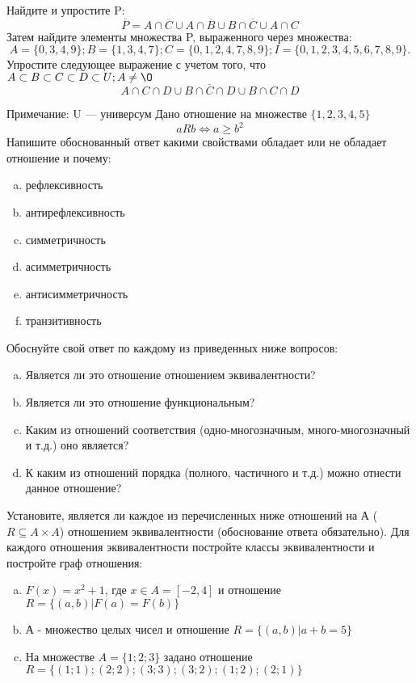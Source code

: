 \documentclass[10pt]{exam}
\begin{document}
\begin{questions}
\question
Найдите и упростите P:
\begin{equation*}
\overline{P} = A \cap \overline{C} \cup A \cap \overline{B} \cup B \cap \overline{C} \cup A \cap C
\end{equation*}
Затем найдите элементы множества P, выраженного через множества:
\begin{equation*}
A = \{0, 3, 4, 9\}; 
B = \{1, 3, 4, 7\};
C = \{0, 1, 2, 4, 7, 8, 9\};
I = \{0, 1, 2, 3, 4, 5, 6, 7, 8, 9\}.
\end{equation*}\question
Упростите следующее выражение с учетом того, что $A\subset B \subset C \subset D \subset U; A \neq \O$
\begin{equation*}
A \cap C  \cap D \cup B \cap \overline{C} \cap D \cup B \cap C \cap D
\end{equation*}

Примечание: U — универсум\question
Дано отношение на множестве $\{1, 2, 3, 4, 5\}$ 
\begin{equation*}
aRb \iff a \geq b^2
\end{equation*}
Напишите обоснованный ответ какими свойствами обладает или не обладает отношение и почему:   
\begin{enumerate} [a)]\setcounter{enumi}{0}
\item рефлексивность
\item антирефлексивность
\item симметричность
\item асимметричность
\item антисимметричность
\item транзитивность
\end{enumerate}

Обоснуйте свой ответ по каждому из приведенных ниже вопросов:
\begin{enumerate} [a)]\setcounter{enumi}{0}
    \item Является ли это отношение отношением эквивалентности?
    \item Является ли это отношение функциональным?
    \item Каким из отношений соответствия (одно-многозначным, много-многозначный и т.д.) оно является?
    \item К каким из отношений порядка (полного, частичного и т.д.) можно отнести данное отношение?
\end{enumerate}


\question
Установите, является ли каждое из перечисленных ниже отношений на А ($R \subseteq A \times A$) отношением эквивалентности (обоснование ответа обязательно). Для каждого отношения эквивалентности постройте классы эквивалентности и постройте граф отношения:
\begin{enumerate} [a)]\setcounter{enumi}{0}
\item $F(x)=x^{2}+1$, где $x \in A = [-2, 4]$ и отношение $R = \{(a,b)|F(a) = F(b)\}$
\item А - множество целых чисел и отношение $R = \{(a,b)|a + b = 5\}$
\item На множестве $A = \{1; 2; 3\}$ задано отношение $R = \{(1; 1); (2; 2); (3; 3); (3; 2); (1; 2); (2; 1)\}$


\end{enumerate}
\end{questions}
\end{document}
